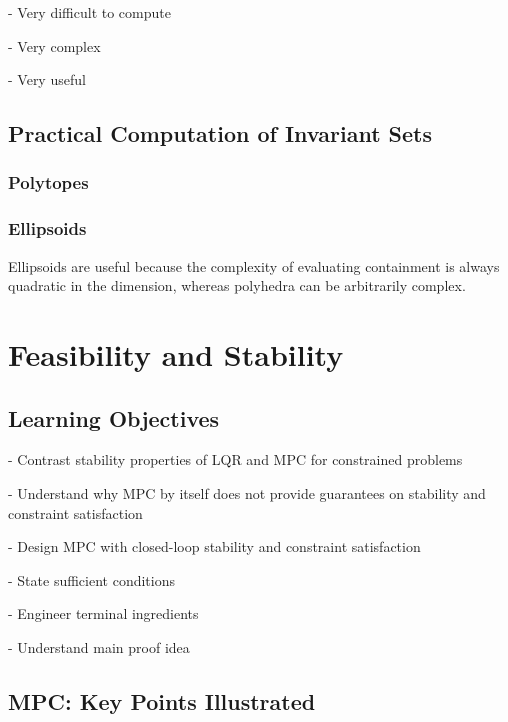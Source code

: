 - Very difficult to compute

- Very complex

- Very useful

\subsection{Practical Computation of Invariant Sets}

\subsubsection{Polytopes}
\subsubsection{Ellipsoids}

Ellipsoids are useful because the complexity of evaluating containment is always
quadratic in the dimension, whereas polyhedra can be arbitrarily complex.



\section{Feasibility and Stability}


\subsection{Learning Objectives}

- Contrast stability properties of LQR and MPC for constrained problems

- Understand why MPC by itself does not provide guarantees
on stability and constraint satisfaction

- Design MPC with closed-loop stability and constraint satisfaction

- State sufficient conditions

- Engineer terminal ingredients

- Understand main proof idea

\subsection{MPC: Key Points Illustrated}


